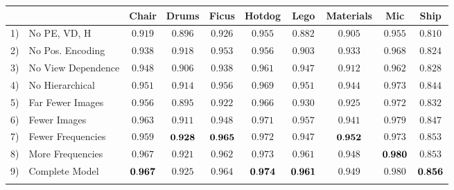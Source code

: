 \begin{table}[t]
{\begin{tabular}{ll|cccccccc}
&& Chair & Drums & Ficus & Hotdog & Lego & Materials & Mic & Ship  \\
\hline
1) & No PE, VD, H              &      $0.919$  &      $0.896$  &      $0.926$  &      $0.955$  &      $0.882$  &      $0.905$  &      $0.955$  &      $0.810$  \\
2) & No Pos. Encoding          &      $0.938$  &      $0.918$  &      $0.953$  &      $0.956$  &      $0.903$  &      $0.933$  &      $0.968$  &      $0.824$  \\
3) & No View Dependence        &      $0.948$  &      $0.906$  &      $0.938$  &      $0.961$  &      $0.947$  &      $0.912$  &      $0.962$  &      $0.828$  \\
4) & No Hierarchical           &      $0.951$  &      $0.914$  &      $0.956$  &      $0.969$  &      $0.951$  &      $0.944$  &      $0.973$  &      $0.844$  \\
\arrayrulecolor{gray}
\hline
\arrayrulecolor{black}
5) & Far Fewer Images          &      $0.956$  &      $0.895$  &      $0.922$  &      $0.966$  &      $0.930$  &      $0.925$  &      $0.972$  &      $0.832$  \\
6) & Fewer Images              &      $0.963$  &      $0.911$  &      $0.948$  &      $0.971$  &      $0.957$  &      $0.941$  &      $0.979$  &      $0.847$  \\
\arrayrulecolor{gray}
\hline
\arrayrulecolor{black}
7) & Fewer Frequencies         &      $0.959$  & ${\mathbf{0.928}}$ & ${\mathbf{0.965}}$ &      $0.972$  &      $0.947$  & ${\mathbf{0.952}}$ &      $0.973$  &      $0.853$  \\
8) & More Frequencies          &      $0.967$  &      $0.921$  &      $0.962$  &      $0.973$  &      $0.961$  &      $0.948$  & ${\mathbf{0.980}}$ &      $0.853$  \\
\arrayrulecolor{gray}
\hline
\arrayrulecolor{black}
9) & Complete Model            & ${\mathbf{0.967}}$ &      $0.925$  &      $0.964$  & ${\mathbf{0.974}}$ & ${\mathbf{0.961}}$ &      $0.949$  &      $0.980$  & ${\mathbf{0.856}}$ \\
\hline
\multicolumn{9}{c}{}
\end{tabular}
} \vspace{2mm}
\end{table}
